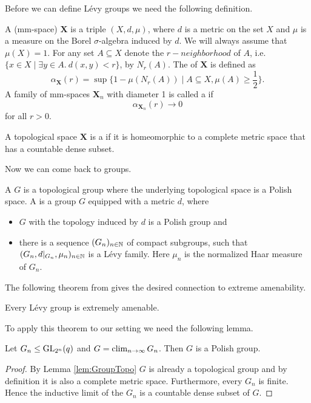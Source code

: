 Before we can define L\'evy groups we need the following definition.
\begin{definition}
A  (mm-space) $\boldsymbol{X}$ is a triple $(X,d,\mu)$, where $d$ is a metric on the set $X$ and $\mu$ is a measure on the Borel $\sigma$-algebra induced by $d$. We will always assume that $\mu(X)=1$. 
For any set $A\subseteq X$ denote the $r-neighborhood$ of $A$, i.e. $\{x\in X\mid\exists y\in A.\  d(x,y)<r\}$, by $N_r(A)$.%
The  of $\boldsymbol{X}$ is defined as 
\[\alpha_{\boldsymbol{X}}(r)=\sup\{1-\mu(N_r(A))\mid A\subseteq X, \mu(A)\geq\frac{1}{2}\}.\]
A family of mm-spaces $\boldsymbol{X}_n$ with diameter 1 is called a  if 
\[\alpha_{\boldsymbol{X}_n}(r)\to 0\]
for all $r>0$.

A topological space $\boldsymbol{X}$ is a  if it is homeomorphic to a complete metric space that has a countable dense subset.
\end{definition}

Now we can come back to groups.
\begin{definition}
A  $G$ is a topological group where the underlying topological space is a Polish space. A  is a group $G$ equipped with a metric $d$, where
\begin{itemize}
\item $G$ with the topology induced by $d$ is a Polish group and
\item there is a sequence $(G_n)_{n\in\mathbb{N}}$ of compact subgroups, such that $(G_n,d|_{G_n},\mu_n)_{n\in\mathbb{N}}$ is a L\'evy family. Here $\mu_n$ is the normalized Haar measure of $G_n$.
\end{itemize}  
\end{definition}

The following theorem from \cite{Levy} gives the desired connection to extreme amenability.
\begin{theorem}
Every L\'evy group is extremely amenable.
\end{theorem}

To apply this theorem to our setting we need the following lemma.
\begin{lemma}
Let $G_n\leq\operatorname{GL}_{2^n}(q)$ and $G=\operatorname{clim}\limits_{n\to\infty} G_n$. Then $G$ is a Polish group. 
\end{lemma}
\begin{proof}
By Lemma \ref{lem:GroupTopo} $G$ is already a topological group and by definition it is also a complete metric space. Furthermore, every $G_n$ is finite. Hence the inductive limit of the $G_n$ is a countable dense subset of $G$.
\end{proof}

